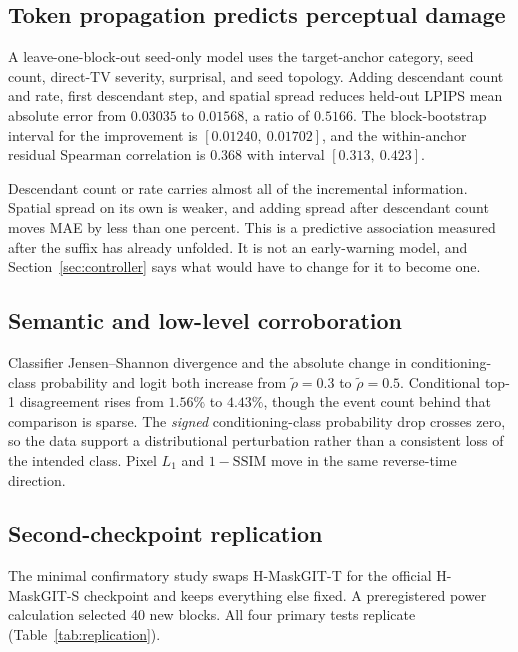 \documentclass[11pt,a4paper]{article}
\theoremstyle{plain}
\theoremstyle{definition}
\theoremstyle{remark}
\newcommand{\rholabel}{\widetilde{\rho}}
\begin{document}
\subsection{Token propagation predicts perceptual damage}
\label{sec:prediction}

A leave-one-block-out seed-only model uses the target-anchor category, seed count, direct-TV
severity, surprisal, and seed topology. Adding descendant count and rate, first
descendant step, and spatial spread reduces held-out LPIPS mean absolute error
from $0.03035$ to $0.01568$, a ratio of $0.5166$. The block-bootstrap interval
for the improvement is $[0.01240,\ 0.01702]$, and the within-anchor residual
Spearman correlation is $0.368$ with interval $[0.313,\ 0.423]$.

Descendant count or rate carries almost all of the incremental information.
Spatial spread on its own is weaker, and adding spread after descendant count
moves MAE by less than one percent. This is a predictive association measured
after the suffix has already unfolded. It is not an early-warning model, and
Section~\ref{sec:controller} says what would have to change for it to become one.

\subsection{Semantic and low-level corroboration}

Classifier Jensen--Shannon divergence and the absolute change in
conditioning-class probability and logit both increase from $\rholabel=0.3$ to
$\rholabel=0.5$. Conditional top-1 disagreement rises from $1.56\%$ to $4.43\%$,
though the event count behind that comparison is sparse. The \emph{signed}
conditioning-class probability drop crosses zero, so the data support a
distributional perturbation rather than a consistent loss of the intended class.
Pixel $L_1$ and $1-\mathrm{SSIM}$ move in the same reverse-time direction.

\subsection{Second-checkpoint replication}
\label{sec:replication}

The minimal confirmatory study swaps H-MaskGIT-T for the official H-MaskGIT-S
checkpoint and keeps everything else fixed. A preregistered power calculation
selected 40 new blocks. All four primary tests replicate
(Table~\ref{tab:replication}).
\end{document}
